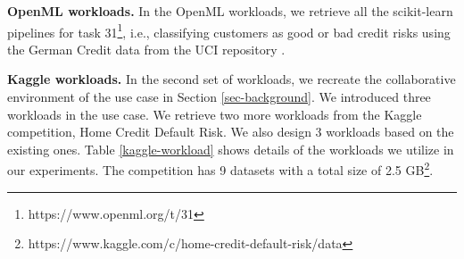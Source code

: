 \textbf{OpenML workloads.} In the OpenML workloads, we retrieve all the scikit-learn pipelines for task 31\footnote{https://www.openml.org/t/31}, i.e., classifying customers as good or bad credit risks using the German Credit data from the UCI repository \cite{asuncion2007uci}.
%

\textbf{Kaggle workloads.} 
In the second set of workloads, we recreate the collaborative environment of the use case in Section \ref{sec-background}.
We introduced three workloads in the use case.
We retrieve two more workloads from the Kaggle competition, Home Credit Default Risk.
We also design 3 workloads based on the existing ones.
Table \ref{kaggle-workload} shows details of the workloads we utilize in our experiments.
The competition has 9 datasets with a total size of 2.5 GB\footnote{https://www.kaggle.com/c/home-credit-default-risk/data}.

